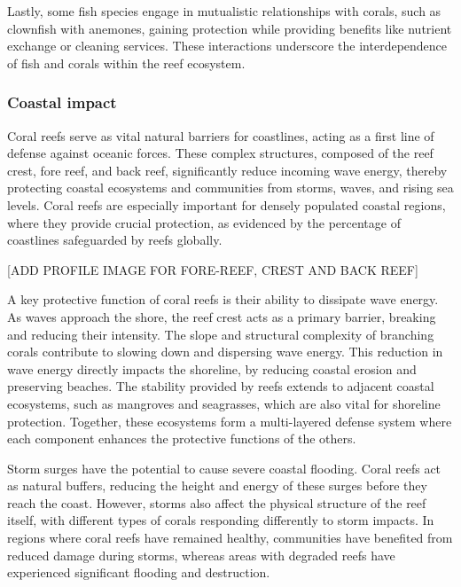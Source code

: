 Lastly, some fish species engage in mutualistic relationships with corals, such as clownfish with anemones, gaining protection while providing benefits like nutrient exchange or cleaning services. These interactions underscore the interdependence of fish and corals within the reef ecosystem. 


\subsubsection{Coastal impact}
Coral reefs serve as vital natural barriers for coastlines, acting as a first line of defense against oceanic forces. These complex structures, composed of the reef crest, fore reef, and back reef, significantly reduce incoming wave energy, thereby protecting coastal ecosystems and communities from storms, waves, and rising sea levels. Coral reefs are especially important for densely populated coastal regions, where they provide crucial protection, as evidenced by the percentage of coastlines safeguarded by reefs globally.

[ADD PROFILE IMAGE FOR FORE-REEF, CREST AND BACK REEF]

A key protective function of coral reefs is their ability to dissipate wave energy. As waves approach the shore, the reef crest acts as a primary barrier, breaking and reducing their intensity. The slope and structural complexity of branching corals contribute to slowing down and dispersing wave energy. This reduction in wave energy directly impacts the shoreline, by reducing coastal erosion and preserving beaches. The stability provided by reefs extends to adjacent coastal ecosystems, such as mangroves and seagrasses, which are also vital for shoreline protection. Together, these ecosystems form a multi-layered defense system where each component enhances the protective functions of the others.

Storm surges have the potential to cause severe coastal flooding. Coral reefs act as natural buffers, reducing the height and energy of these surges before they reach the coast. However, storms also affect the physical structure of the reef itself, with different types of corals responding differently to storm impacts. In regions where coral reefs have remained healthy, communities have benefited from reduced damage during storms, whereas areas with degraded reefs have experienced significant flooding and destruction. 

